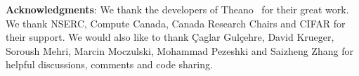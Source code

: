 \documentclass{article} %
\begin{document}


{\bf Acknowledgments}: We thank the developers of
Theano~\citep{Fred2010} for %
their great work. We thank NSERC, Compute Canada, Canada Research Chairs and CIFAR for their support. We would also like to thank \c{C}aglar Gul\c{c}ehre, David Krueger, Soroush Mehri, Marcin Moczulski, Mohammad Pezeshki and Saizheng Zhang for helpful discussions, comments and code sharing.



\end{document}
